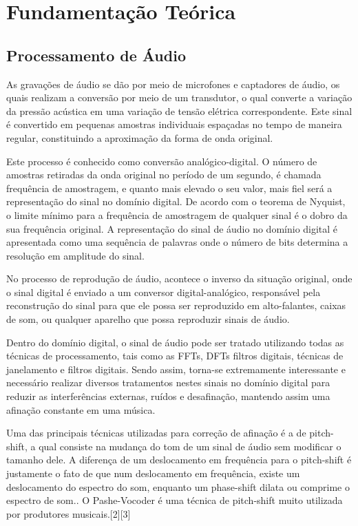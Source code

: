 \chapter{Fundamentação Teórica}\label{cap:CnptDsng}

\section*{Processamento de Áudio}\label{sec:esc_freq}
As gravações de áudio se dão por meio de microfones e captadores de áudio, os quais realizam a conversão por meio de um transdutor, o qual converte a variação da pressão acústica em uma variação de tensão elétrica correspondente. Este sinal é convertido em pequenas amostras individuais espaçadas no tempo de maneira regular, constituindo a aproximação da forma de onda original.

Este processo é conhecido como conversão analógico-digital. O número de amostras retiradas da onda original no período de um segundo, é chamada frequência de amostragem, e quanto mais elevado o seu valor, mais fiel será a representação do sinal no domínio digital. De acordo com o teorema de Nyquist, o limite mínimo para a frequência de amostragem de qualquer sinal é o dobro da sua frequência original. A representação do sinal de áudio no domínio digital é apresentada como uma sequência de palavras onde o número de bits determina a resolução em amplitude do sinal.

No processo de reprodução de áudio, acontece o inverso da situação original, onde o sinal digital é enviado a um conversor digital-analógico, responsável pela reconstrução do sinal para que ele possa ser reproduzido em alto-falantes, caixas de som, ou qualquer aparelho que possa reproduzir sinais de áudio.

Dentro do domínio digital, o sinal de áudio pode ser tratado utilizando todas as técnicas de processamento, tais como as FFTs, DFTs filtros digitais, técnicas de janelamento e filtros digitais. Sendo assim, torna-se extremamente interessante e necessário realizar diversos tratamentos nestes sinais no domínio digital para reduzir as interferências externas, ruídos e desafinação, mantendo assim uma afinação constante em uma música. 

Uma das principais técnicas utilizadas para correção de afinação é a de pitch-shift, a qual consiste na mudança do tom de um sinal de áudio sem modificar o tamanho dele. A diferença de um deslocamento em frequência para o pitch-shift é justamente o fato de que num deslocamento em frequência, existe um deslocamento do espectro do som, enquanto um phase-shift dilata ou comprime o espectro de som.. O Pashe-Vocoder é uma técnica de pitch-shift muito utilizada por produtores musicais.[2][3] 


